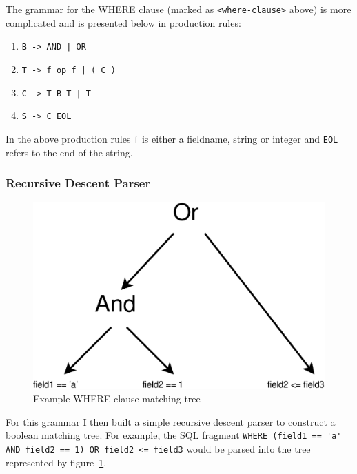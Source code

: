 \documentclass[12pt,twoside,notitlepage]{report}
\begin{document}
The grammar for the WHERE clause (marked as \verb+<where-clause>+ above) is more complicated and
is presented below in production rules:
\begin{enumerate}
\item \verb+B -> AND | OR+
\item \verb+T -> f op f | ( C )+
\item \verb+C -> T B T | T+
\item \verb+S -> C EOL+
\end{enumerate}

In the above production rules \verb+f+ is either a fieldname, string or integer and \verb+EOL+
refers to the end of the string.

\subsubsection{Recursive Descent Parser}

\begin{figure}[htb]
\centering
\includegraphics[scale=0.5]{figs/where-ast.eps}
\caption{\label{fig:where-ast}Example WHERE clause matching tree}
\end{figure}

For this grammar I then built a simple recursive descent parser to construct a boolean matching
tree. For example, the SQL fragment \verb+WHERE (field1 == 'a' AND field2 == 1) OR field2 <= field3+
would be parsed into the tree represented by figure~\ref{fig:where-ast}.

% 
% 
%
\end{document}
